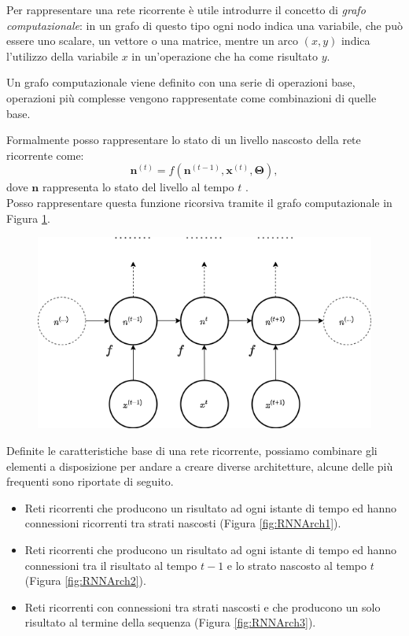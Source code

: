 \documentclass[../../main.tex]{subfiles}
\begin{document}
Per rappresentare una rete ricorrente è utile introdurre il concetto di \textit{grafo computazionale}: in un grafo di questo tipo ogni nodo indica una variabile, che può essere uno scalare, un vettore o una matrice, mentre un arco $(x,y)$ indica l'utilizzo della variabile $x$ in un'operazione che ha come risultato $y$.

Un grafo computazionale viene definito con una serie di operazioni base, operazioni più complesse vengono rappresentate come combinazioni di quelle base.

Formalmente posso rappresentare lo stato di un livello nascosto della rete ricorrente come:
\[\boldsymbol{n}^{(t)} = f(\boldsymbol{n}^{(t-1)}, \boldsymbol{x}^{(t)}, \boldsymbol{\Theta}),\]
dove $\boldsymbol{n}$ rappresenta lo stato del livello al tempo $t$ .\\
Posso rappresentare questa funzione ricorsiva tramite il grafo computazionale in Figura \ref{fig:computationgraph}.
\begin{figure}[H]
    \centering
    \includegraphics[scale = 0.4]{immagini/4_2/computation_graph.png}
    \caption{}
    \label{fig:computationgraph}
\end{figure}

Definite le caratteristiche base di una rete ricorrente, possiamo combinare gli elementi a disposizione per andare a creare diverse architetture, alcune delle più frequenti sono riportate di seguito.

\begin{itemize}
    \item Reti ricorrenti che producono un risultato ad ogni istante di tempo ed hanno connessioni ricorrenti tra strati nascosti (Figura \ref{fig:RNNArch1}).
    \item Reti ricorrenti che producono un risultato ad ogni istante di tempo ed hanno connessioni tra il risultato al tempo $t-1$ e lo strato nascosto al tempo $t$ (Figura \ref{fig:RNNArch2}).
    \item Reti ricorrenti con connessioni tra strati nascosti e che producono un solo risultato al termine della sequenza (Figura \ref{fig:RNNArch3}).
\end{itemize}
\end{document}
